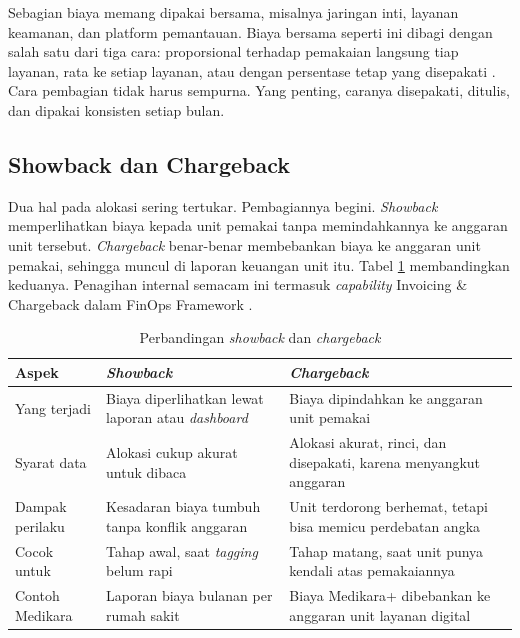 Sebagian biaya memang dipakai bersama, misalnya jaringan inti, layanan keamanan, dan platform
pemantauan. Biaya bersama seperti ini dibagi dengan salah satu dari tiga cara: proporsional terhadap
pemakaian langsung tiap layanan, rata ke setiap layanan, atau dengan persentase tetap yang
disepakati \cite{storment2023}. Cara pembagian tidak harus sempurna. Yang penting, caranya
disepakati, ditulis, dan dipakai konsisten setiap bulan.

\subsection{Showback dan Chargeback}

Dua hal pada alokasi sering tertukar. Pembagiannya begini. \textit{Showback} memperlihatkan biaya
kepada unit pemakai tanpa memindahkannya ke anggaran unit tersebut. \textit{Chargeback} benar-benar
membebankan biaya ke anggaran unit pemakai, sehingga muncul di laporan keuangan unit itu. Tabel
\ref{tab:ch03-showback-chargeback} membandingkan keduanya. Penagihan internal semacam ini termasuk
\textit{capability} Invoicing \& Chargeback dalam FinOps Framework \cite{finops2026}.

\begin{table}[!htb]
  \centering
  \caption{Perbandingan \textit{showback} dan \textit{chargeback}}
  \label{tab:ch03-showback-chargeback}
  \footnotesize
  \begin{tabularx}{\textwidth}{>{\raggedright\arraybackslash}p{2.4cm} >{\raggedright\arraybackslash}X >{\raggedright\arraybackslash}X}
    \hline
    \textbf{Aspek} & \textbf{\textit{Showback}} & \textbf{\textit{Chargeback}} \\ \hline
    Yang terjadi & Biaya diperlihatkan lewat laporan atau \textit{dashboard} & Biaya dipindahkan ke
      anggaran unit pemakai \\ \hline
    Syarat data & Alokasi cukup akurat untuk dibaca & Alokasi akurat, rinci, dan disepakati, karena
      menyangkut anggaran \\ \hline
    Dampak perilaku & Kesadaran biaya tumbuh tanpa konflik anggaran & Unit terdorong berhemat,
      tetapi bisa memicu perdebatan angka \\ \hline
    Cocok untuk & Tahap awal, saat \textit{tagging} belum rapi & Tahap matang, saat unit punya
      kendali atas pemakaiannya \\ \hline
    Contoh Medikara & Laporan biaya bulanan per rumah sakit & Biaya Medikara+ dibebankan ke anggaran
      unit layanan digital \\ \hline
  \end{tabularx}
\end{table}

